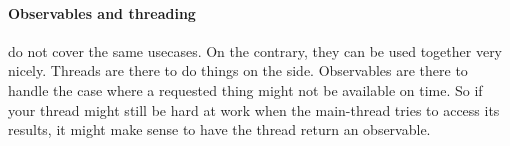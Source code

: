 \paragraph{Observables and threading} do not cover the same usecases. On the contrary, they can be used together very nicely. Threads are there to do things on the side. Observables are there to handle the case where a requested thing might not be available on time. So if your thread might still be hard at work when the main-thread tries to access its results, it might make sense to have the thread return an observable. 